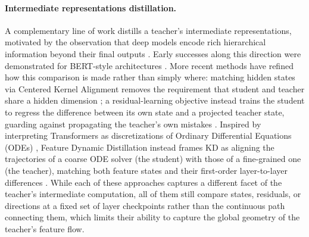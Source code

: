 \documentclass{article} %
\theoremstyle{definition}
\theoremstyle{remark}
\begin{document}
\paragraph{Intermediate representations distillation.} A complementary line of work distills a teacher's intermediate representations, motivated by the observation that deep models encode rich hierarchical information beyond their final outputs \cite{skean2025layerlayeruncoveringhidden}. Early successes along this direction were demonstrated for BERT-style architectures \cite{sanh2020distilbertdistilledversionbert, jiao2020tinybertdistillingbertnatural}. More recent methods have refined how this comparison is made rather than simply where: matching hidden states via Centered Kernel Alignment removes the requirement that student and teacher share a hidden dimension \cite{dasgupta2025improving}; a residual-learning objective instead trains the student to regress the difference between its own state and a projected teacher state, guarding against propagating the teacher's own mistakes \cite{on2026knowledge}. Inspired by interpreting Transformers as discretizations of Ordinary Differential Equations (ODEs) \cite{chen2019neuralordinarydifferentialequations, lu2019understandingimprovingtransformermultiparticle}, Feature Dynamic Distillation instead frames KD as aligning the trajectories of a coarse ODE solver (the student) with those of a fine-grained one (the teacher), matching both feature states and their first-order layer-to-layer differences \cite{gong-etal-2025-beyond}. While each of these approaches captures a different facet of the teacher's intermediate computation, all of them still compare states, residuals, or directions at a fixed set of layer checkpoints rather than the continuous path connecting them, which limits their ability to capture the global geometry of the teacher's feature flow.
\end{document}
